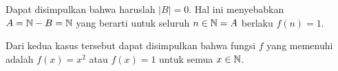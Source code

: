 \begin{solusi}
\begin{itemize}
        Dapat disimpulkan bahwa haruslah $|B|=0$. Hal ini menyebabkan $A = \mathbb N - B = \mathbb N$ yang berarti untuk seluruh $n \in \mathbb N=A$ berlaku $f(n)=1$.
    \end{itemize}
    Dari kedua kasus tersebut dapat disimpulkan bahwa fungsi $f$ yang memenuhi adalah $f(x)=x^2$ atau $f(x)=1$ untuk semua $x \in \mathbb N$.
\end{solusi}